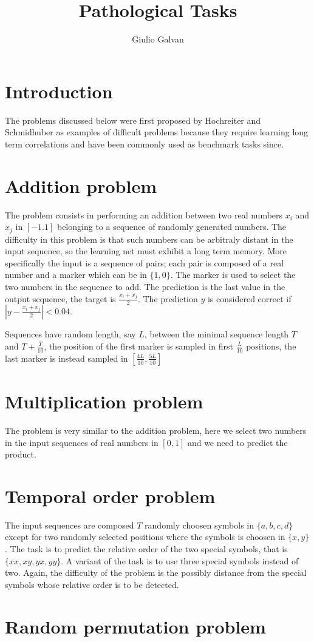 \documentclass{article}
\title{ Pathological Tasks}
\author{Giulio Galvan}
\begin{document}
\maketitle

\begin{abstract}
\end{abstract}

\section{Introduction}
The problems discussed below were first proposed by Hochreiter and Schmidhuber\cite{Hochreiter95longshort-term} as examples of difficult problems because they require learning long term correlations and have
been commonly used as benchmark tasks since.


\section{Addition problem}
The problem consists in performing an addition between two real numbers $x_i$ and $x_j$ in $[-1.1]$ belonging to a sequence of randomly generated numbers. The difficulty in this problem is that such numbers can be arbitraly
distant in the input sequence, so the learning net must exhibit a long term memory. More specifically the input is a sequence of pairs; each pair is composed of a real number and a marker which can be in
$\{1,0\}$. The marker is used to select the two numbers in the sequence to add. The prediction is the last value in the output sequence, the target is $\frac{x_i+x_j}{2}$. The prediction $y$ is considered correct
if $|y-\frac{x_i+x_j}{2}| < 0.04$.

Sequences have random length, say $L$, between the minimal sequence length $T$ and $T+\frac{T}{10}$, the position of the first marker is sampled in first $\frac{L}{10}$ positions, the last marker is
instead sampled in $[\frac{4L}{10},\frac{5L}{10}]$

\section{Multiplication problem}
The problem is very similar to the addition problem, here we select two numbers in the input sequences of real numbers in $[0,1]$ and we need to predict the product.

\section{Temporal order problem}
The input sequences are composed $T$ randomly choosen symbols in $\{a,b,c,d\}$ except for two randomly selected positions where the symbols is choosen in $\{x,y\}$.
The task is to predict the relative order of the two special symbols, that is $\{xx,xy,yx,yy\}$. A variant of the task is to use three special symbols instead of two.
Again, the difficulty of the problem is the possibly distance from the special symbols whose relative order is to be detected.

\section{Random permutation problem}







\newpage
\nocite{*}		 %
{}

\end{document}
